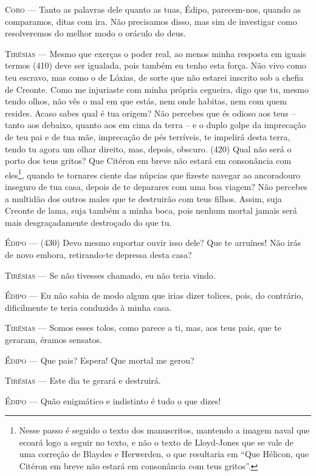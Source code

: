 \textsc{Coro} --- Tanto as palavras dele quanto as tuas, Édipo, parecem-nos, quando as
comparamos, ditas com ira. Não precisamos disso, mas sim de investigar
como resolveremos do melhor modo o oráculo do deus.

\textsc{Tirésias} --- Mesmo que exerças o poder real, ao menos minha resposta em iguais termos
(410) deve ser igualada, pois também eu tenho esta força. Não vivo como
teu escravo, mas como o de Lóxias, de sorte que não estarei inscrito sob
a chefia de Creonte. Como me injuriaste com minha própria cegueira, digo
que tu, mesmo tendo olhos, não vês o mal em que estás, nem onde habitas,
nem com quem resides. Acaso sabes qual é tua origem? Não percebes que és
odioso aos teus -- tanto aos debaixo, quanto aos em cima da terra -- e o
duplo golpe da imprecação de teu pai e de tua mãe, imprecação de pés
terríveis, te impelirá desta terra, tendo tu agora um olhar direito,
mas, depois, obscuro. (420) Qual não será o porto dos teus gritos? Que
Citéron em breve não estará em consonância com eles\footnote{Nesse passo
  é seguido o texto dos manuscritos, mantendo a imagem naval que ecoará
  logo a seguir no texto, e não o texto de Lloyd-Jones que se vale de
  uma correção de Blaydes e Herwerden, o que resultaria em ``Que
  Hélicon, que Citéron em breve não estará em consonância com teus
  gritos''.}, quando te tornares ciente das núpcias que fizeste navegar
ao ancoradouro inseguro de tua casa, depois de te deparares com uma boa
viagem? Não percebes a multidão dos outros males que te destruirão com
teus filhos. Assim, suja Creonte de lama, suja também a minha boca, pois
nenhum mortal jamais será mais desgraçadamente destroçado do que tu.

\textsc{Édipo} --- (430) Devo mesmo suportar ouvir isso dele? Que te arruínes! Não irás de
novo embora, retirando-te depressa desta casa?

\textsc{Tirésias} --- Se não tivesses chamado, eu não teria vindo.

\textsc{Édipo} --- Eu não sabia de modo algum que irias dizer tolices, pois, do contrário,
dificilmente te teria conduzido à minha casa.

\textsc{Tirésias} --- Somos esses tolos, como parece a ti, mas, aos teus pais, que te geraram,
éramos sensatos.

\textsc{Édipo} --- Que pais? Espera! Que mortal me gerou?

\textsc{Tirésias} --- Este dia te gerará e destruirá.

\textsc{Édipo} --- Quão enigmático e indistinto é tudo o que dizes!

